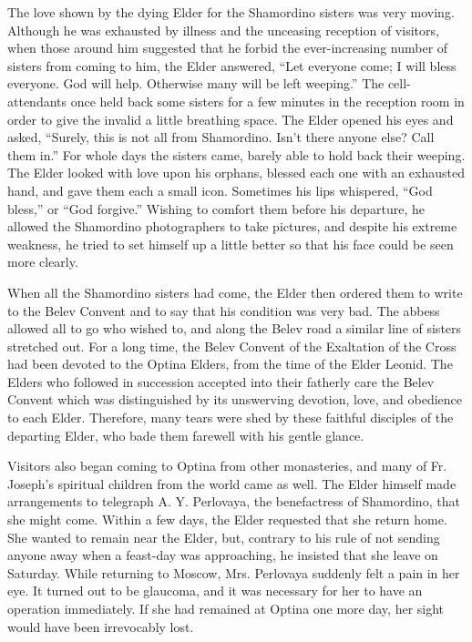 The love shown by the dying Elder for the Shamordino sisters was very moving. Although he was exhausted by illness and the unceasing reception of visitors, when those around him suggested that he forbid the ever-increasing number of sisters from coming to him, the Elder answered, “Let everyone come; I will bless everyone. God will help. Otherwise many will be left weeping.” The cell-attendants once held back some sisters for a few minutes in the reception room in order to give the invalid a little breathing space. The Elder opened his eyes and asked, “Surely, this is not all from Shamordino. Isn't there anyone else? Call them in.” For whole days the sisters came, barely able to hold back their weeping. The Elder looked with love upon his orphans, blessed each one with an exhausted hand, and gave them each a small icon. Sometimes his lips whispered, “God bless,'' or “God forgive.” Wishing to comfort them before his departure, he allowed the Shamordino photographers to take pictures, and despite his extreme weakness, he tried to set himself up a little better so that his face could be seen more clearly.

When all the Shamordino sisters had come, the Elder then ordered them to write to the Belev Convent and to say that his condition was very bad. The abbess allowed all to go who wished to, and along the Belev road a similar line of sisters stretched out. For a long time, the Belev Convent of the Exaltation of the Cross had been devoted to the Optina Elders, from the time of the Elder Leonid. The Elders who followed in succession accepted into their fatherly care the Belev Convent which was distinguished by its unswerving devotion, love, and obedience to each Elder. Therefore, many tears were shed by these faithful disciples of the departing Elder, who bade them farewell with his gentle glance.

Visitors also began coming to Optina from other monasteries, and many of Fr. Joseph's spiritual children from the world came as well. The Elder himself made arrangements to telegraph A. Y. Perlovaya, the benefactress of Shamordino, that she might come. Within a few days, the Elder requested that she return home. She wanted to remain near the Elder, but, contrary to his rule of not sending anyone away when a feast-day was approaching, he insisted that she leave on Saturday. While returning to Moscow, Mrs. Perlovaya suddenly felt a pain in her eye. It turned out to be glaucoma, and it was necessary for her to have an operation immediately. If she had remained at Optina one more day, her sight would have been irrevocably lost.


